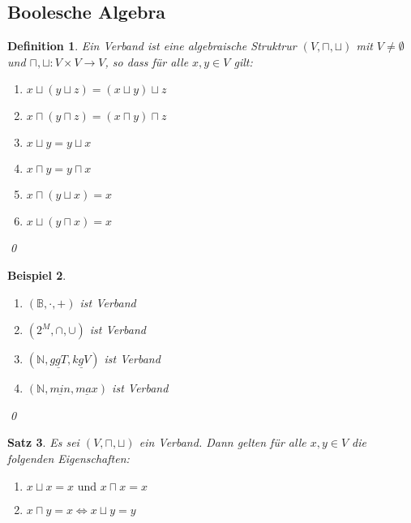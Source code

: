 \documentclass[ngerman]{scrartcl}
\theoremstyle{custom}
\newtheorem{mdef}{Definition} \numberwithin{mdef}{subsection}
\newtheorem{mex}[mdef]{Beispiel}
\newtheorem{ms}[mdef]{Satz}
\newcommand{\0}{\mathbf{0}}
\newcommand{\1}{\mathbf{L}}
\begin{document}
\subsection{Boolesche Algebra}
\begin{mdef} Ein \emph{Verband} ist eine algebraische Struktrur $(V,
  \sqcap, \sqcup)$ mit $V \not = \emptyset$ und $\sqcap, \sqcup: V \times
  V \rightarrow V$, so dass f\"ur alle $x, y \in V$ gilt:
\begin{enumerate}
\item $x \sqcup (y \sqcup z) = (x \sqcup y) \sqcup z$
\item $x \sqcap (y \sqcap z) = (x \sqcap y) \sqcap z$
\item $x \sqcup y = y \sqcup x$
\item $x \sqcap y = y \sqcap x$
\item $x \sqcap (y \sqcup x) = x$
\item $x \sqcup (y \sqcap x) = x$
\end{enumerate}
\qed
\end{mdef}

\begin{mex}

\begin{enumerate}

\item $(\mathds{B}, \cdot, +)$ ist Verband
\item $(2^M, \cap, \cup)$ ist Verband
\item $(\mathds{N}, \underline{ggT}, \underline{kgV})$ ist Verband
\item $(\mathds{N}, \underline{min}, \underline{max})$ ist Verband
\end{enumerate}
\qed
\end{mex}

\begin{ms}
Es sei $(V, \sqcap, \sqcup)$ ein Verband. Dann gelten f\"ur alle $x,y
\in V$ die folgenden Eigenschaften:
\begin{enumerate}
\item $x \sqcup x = x \text{ und } x \sqcap x = x$
\item $x \sqcap y = x \Leftrightarrow x \sqcup y = y$
\end{enumerate}
\end{ms}
\end{document}

